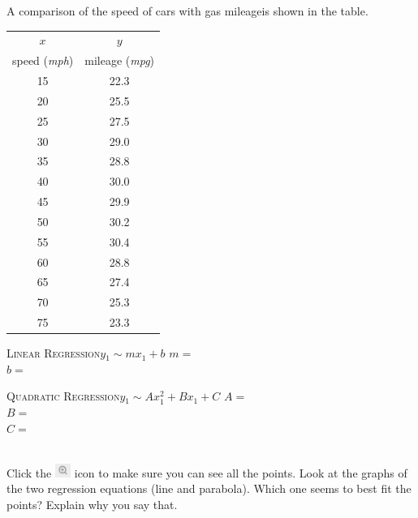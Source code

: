 \documentclass[12pt,letterpaper]{memoir}
\begin{document}
\myWideProblemWithContent 
{
    A comparison of the speed of cars with gas mileageis 
    shown in the table.\\[0.5em]
    \begin{minipage}{0.35\textwidth}
        \footnotesize
        \begin{tabular}{cc}
            $x$ & $y$ \\ 
            speed ({\itshape mph}) & mileage ({\itshape mpg}) \\
            \midrule 
            15 & 22.3 \\
            20 & 25.5 \\ 
            25 & 27.5 \\ 
            30 & 29.0 \\ 
            35 & 28.8 \\ 
            40 & 30.0 \\ 
            45 & 29.9 \\ 
            50 & 30.2 \\ 
            55 & 30.4 \\ 
            60 & 28.8 \\ 
            65 & 27.4 \\ 
            70 & 25.3 \\ 
            75 & 23.3 \\ 
            \bottomrule
        \end{tabular}
        \end{minipage}
    \begin{minipage}{0.64\textwidth}
        \begin{tcolorbox}[colback=white,width=\textwidth]
            \small
            \scshape{Linear Regression}\hfill$y_1 \sim m x_1 + b$
            \tcblower
            $m =$  \\
            $b =$ 
        \end{tcolorbox}
        \begin{tcolorbox}[colback=white,width=\textwidth]
            \small
            \scshape{Quadratic Regression}\hfill$y_1 \sim A x_1^2 + B x_1 + C$
            \tcblower
            $A =$  \\
            $B =$ \\
            $C =$ 
        \end{tcolorbox}
    \end{minipage}\\[1\onelineskip]
    Click the 
    \includegraphics[width=0.2in]{magnifying-glass-plus.png} 
    icon to make sure you can see all the points.
    Look at the graphs of the two regression equations 
    (line and parabola).
    Which one seems to best fit the points?
    Explain why you say that.
    \vspace{0.7in}
}
\end{document}
